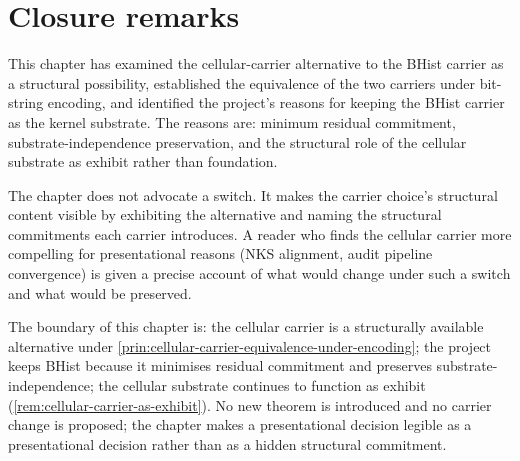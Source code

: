 \section{Closure remarks}
\label{sec:cellular-carrier-closure}

This chapter has examined the cellular-carrier alternative to the BHist carrier as a structural possibility, established the equivalence of the two carriers under bit-string encoding, and identified the project's reasons for keeping the BHist carrier as the kernel substrate. The reasons are: minimum residual commitment, substrate-independence preservation, and the structural role of the cellular substrate as exhibit rather than foundation.

The chapter does not advocate a switch. It makes the carrier choice's structural content visible by exhibiting the alternative and naming the structural commitments each carrier introduces. A reader who finds the cellular carrier more compelling for presentational reasons (NKS alignment, audit pipeline convergence) is given a precise account of what would change under such a switch and what would be preserved.

The boundary of this chapter is: the cellular carrier is a structurally available alternative under \autoref{prin:cellular-carrier-equivalence-under-encoding}; the project keeps BHist because it minimises residual commitment and preserves substrate-independence; the cellular substrate continues to function as exhibit (\autoref{rem:cellular-carrier-as-exhibit}). No new theorem is introduced and no carrier change is proposed; the chapter makes a presentational decision legible as a presentational decision rather than as a hidden structural commitment.


